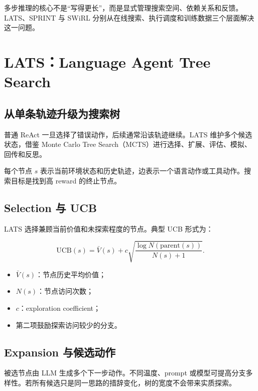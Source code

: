 \documentclass[a4paper]{article}
\begin{document}
多步推理的核心不是“写得更长”，而是显式管理搜索空间、依赖关系和反馈。LATS、SPRINT 与 SWiRL 分别从在线搜索、执行调度和训练数据三个层面解决这一问题。

\section{LATS：Language Agent Tree Search}

\subsection{从单条轨迹升级为搜索树}

普通 ReAct 一旦选择了错误动作，后续通常沿该轨迹继续。LATS 维护多个候选状态，借鉴 Monte Carlo Tree Search（MCTS）进行选择、扩展、评估、模拟、回传和反思。



每个节点 $s$ 表示当前环境状态和历史轨迹，边表示一个语言动作或工具动作。搜索目标是找到高 reward 的终止节点。

\subsection{Selection 与 UCB}

LATS 选择兼顾当前价值和未探索程度的节点。典型 UCB 形式为：

$$
\mathrm{UCB}(s)=\bar V(s)+c\sqrt{\frac{\log N(\mathrm{parent}(s))}{N(s)+1}}.
$$

\begin{itemize}
    \item $\bar V(s)$：节点历史平均价值；
    \item $N(s)$：节点访问次数；
    \item $c$：exploration coefficient；
    \item 第二项鼓励探索访问较少的分支。
\end{itemize}

\subsection{Expansion 与候选动作}

被选节点由 LLM 生成多个下一步动作。不同温度、prompt 或模型可提高分支多样性。若所有候选只是同一思路的措辞变化，树的宽度不会带来实质探索。
\end{document}
